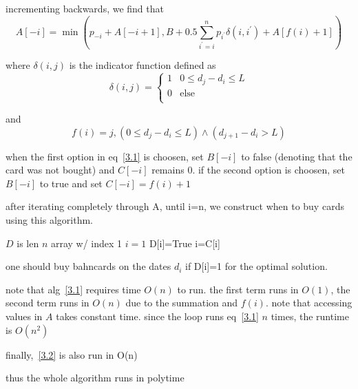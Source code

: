 \documentclass[letterpaper,12pt]{article}
\begin{document}
\begin{enumerate}
incrementing backwards, we find that 
\begin{equation}\label{3.1}
    A[-i] = \min\left(p_{-i}+A[-i+1],B+0.5\sum_{i^\prime = i}^{n}p_{i^\prime}\delta(i,i^\prime)+A[f(i)+1]\right)
\end{equation}

where \(\delta(i,j)\) is the indicator function defined as
\begin{equation}
    \delta(i,j)=\begin{cases}
        1 &0\leq d_j-d_i\leq L\\
        0& \text{else}\\
    \end{cases}
\end{equation}

and
\begin{equation}
    f(i) = j, (0\leq d_j-d_i\leq L) \land (d_{j+1}-d_i>L)
\end{equation}

when the first option in eq~\ref{3.1} is choosen, set \(B[-i]\) to false (denoting that the card was not bought) and \(C[-i]\) remains 0. if the second option is choosen, set \(B[-i]\) to true and set \(C[-i]=f(i)+1\)


after iterating completely through A, until i=n, we construct when to buy cards using this algorithm.

\begin{algorithmic}[1]\label{3.2}
    \State \(D\) is len \(n\) array w/ index 1
    \State \(i=1\)
            \State D[i]=True
            \State i=C[i]
        \EndIf
    \EndWhile
\end{algorithmic}

one should buy bahncards on the dates \(d_i\) if D[i]=1 for the optimal solution.

note that alg~\ref{3.1} requires time \(O(n)\) to run. the first term runs in \(O(1)\), the second term runs in \(O(n)\) due to the summation and \(f(i)\). note that accessing values in \(A\) takes constant time. since the loop runs eq~\ref{3.1} \(n\) times, the runtime is \(O(n^2)\)

finally,~\ref{3.2} is also run in O(n)

thus the whole algorithm runs in polytime




\end{enumerate}
\end{document}
